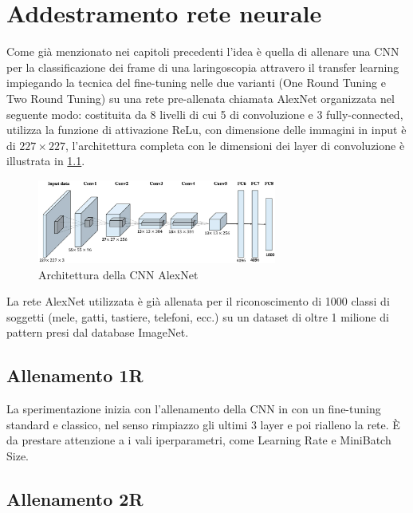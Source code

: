 \chapter{Addestramento rete neurale}\label{addestramento-rete-neurale}


Come già menzionato nei capitoli precedenti l’idea è quella di allenare una  CNN per la classificazione dei frame di una laringoscopia attravero il transfer learning impiegando la tecnica del
fine-tuning nelle due varianti (One Round Tuning e Two Round Tuning)  su una rete pre-allenata chiamata AlexNet  organizzata nel seguente modo: costituita da 8 livelli di cui 5 di convoluzione e 3 fully-connected, utilizza la funzione
di attivazione ReLu, con dimensione delle immagini in input è di \(227\times 227\), l'architettura completa con le dimensioni dei layer di convoluzione è illustrata in \cref{fig:alexnet}\cite{alexnet}.  

\begin{figure}[ht]
    \centering
    \includegraphics[width=0.7\textwidth]{addestramento-rete-neurale/alexnet.png}
    \caption{Architettura della CNN AlexNet}
    \label{fig:alexnet}
\end{figure}

La rete AlexNet utilizzata è già allenata per il riconoscimento di 1000 classi di soggetti (mele, gatti, tastiere, telefoni, ecc.) su un dataset di oltre 1 milione di pattern presi dal database ImageNet\cite{alexnet}.

\section{Allenamento 1R}\label{allenamento-1r}

La sperimentazione inizia con l'allenamento della CNN in con un fine-tuning standard e classico, nel senso rimpiazzo gli ultimi 3 layer e poi rialleno la rete. È da prestare attenzione a i vali iperparametri, come Learning Rate e MiniBatch Size.

\section{Allenamento 2R}\label{allenamento-2r}
